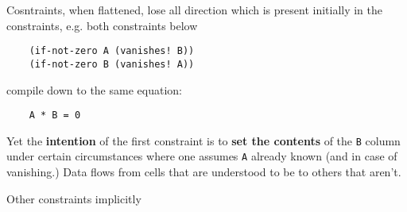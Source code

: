 Cosntraints, when flattened, lose all direction which is present initially in the constraints, e.g. both constraints below
\begin{Verbatim}
	(if-not-zero A (vanishes! B))
	(if-not-zero B (vanishes! A))
\end{Verbatim}
compile down to the same equation:
\begin{Verbatim}
	A * B = 0
\end{Verbatim}
Yet the \textbf{intention} of the first constraint is to \textbf{set the contents} of the \texttt{B} column under certain circumstances where one assumes \texttt{A} already known (and in case of vanishing.) Data flows from cells that are understood to be \godGiven{} to others that aren't.

Other constraints implicitly 
